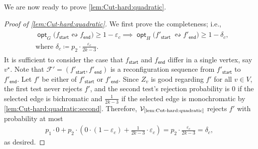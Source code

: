 \documentclass[11pt,fleqn]{article}
\renewcommand{\geq}{\geqslant}
\renewcommand{\epsilon}{\varepsilon}
\newcommand{\reco}{\leftrightsquigarrow}
\newcommand{\defeq}{\coloneq}
\DeclareMathOperator{\opt}{\mathsf{opt}}
\newcommand{\sss}{\mathsf{start}}
\newcommand{\ttt}{\mathsf{end}}
\newcommand{\V}{\calV}
\newcommand{\f}{f}
\newcommand{\sqcol}{\scrF}
\newcommand{\Vquad}{\V_{\text{\ref{lem:Cut-hard:quadratic}}}}
\newcommand{\calV}{\mathcal{V}}
\newcommand{\scrF}{\mathscr{F}}
\theoremstyle{definition}
\numberwithin{equation}{section}
\begin{document}
We are now ready to prove \cref{lem:Cut-hard:quadratic}.

\begin{proof}[Proof of \cref{lem:Cut-hard:quadratic}]
We first prove the completeness; i.e.,
\begin{align}
\begin{aligned}
    & \opt_G\bigl(\f_\sss \reco \f_\ttt\bigr) \geq 1-\epsilon_c \implies
    \opt_H\bigl(\f'_\sss\ \reco \f'_\ttt\bigr) \geq 1 - \delta_c, \\
    & \text{where } \delta_c \defeq p_2 \cdot \frac{\epsilon_c}{2k-3}.
\end{aligned}
\end{align}
It is sufficient to consider the case that
$\f_\sss$ and $\f_\ttt$ differ in a single vertex, say $v^\star$.
Note that $\sqcol' = (\f'_\sss, \f'_\ttt)$ is
a reconfiguration sequence from $\f'_\sss$ to $\f'_\ttt$.
Let $\f'$ be either of $\f'_\sss$ or $\f'_\ttt$.
Since $Z_v$ is good regarding $\f'$ for all $v \in V$,
the first test never rejects $\f'$, and
the second test's rejection probability is
$0$ if the selected edge is bichromatic and
$\frac{1}{2k-3}$ if the selected edge is monochromatic by \cref{lem:Cut-hard:quadratic:second}.
Therefore, $\Vquad$ rejects $\f'$ with probability at most
\begin{align}
    p_1 \cdot 0 +
    p_2 \cdot \left( 0 \cdot (1-\epsilon_c) + \frac{1}{2k-3} \cdot \epsilon_c \right)
    = p_2 \cdot \frac{\epsilon_c}{2k-3}
    = \delta_c,
\end{align}
as desired.


\end{proof}
\end{document}
